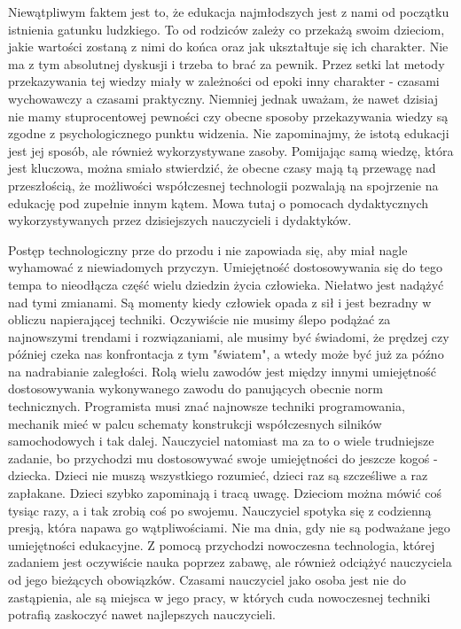 \documentclass{article}
\begin{document}
\par
Niewątpliwym faktem jest to, że edukacja najmłodszych jest z nami od początku istnienia gatunku ludzkiego. To od rodziców zależy co przekażą swoim dzieciom, jakie wartości zostaną z nimi do końca oraz jak ukształtuje się ich charakter. Nie ma z tym absolutnej dyskusji i trzeba to brać za pewnik. Przez setki lat metody przekazywania tej wiedzy miały w zależności od epoki inny charakter - czasami wychowawczy a czasami praktyczny. Niemniej jednak uważam, że nawet dzisiaj nie mamy stuprocentowej pewności czy obecne sposoby przekazywania wiedzy są zgodne z psychologicznego punktu widzenia. Nie zapominajmy, że istotą edukacji jest jej sposób, ale również wykorzystywane zasoby. Pomijając samą wiedzę, która jest kluczowa, można smiało stwierdzić, że obecne czasy mają tą przewagę nad przeszłością, że możliwości współczesnej technologii pozwalają na spojrzenie na edukację pod zupełnie innym kątem. Mowa tutaj o pomocach dydaktycznych wykorzystywanych przez dzisiejszych nauczycieli i dydaktyków.
\par
Postęp technologiczny prze do przodu i nie zapowiada się, aby miał nagle wyhamować z niewiadomych przyczyn. Umiejętność dostosowywania się do tego tempa to nieodłącza część wielu dziedzin życia człowieka. Niełatwo jest nadążyć nad tymi zmianami. Są momenty kiedy człowiek opada z sił i jest bezradny w obliczu napierającej techniki. Oczywiście nie musimy ślepo podążać za najnowszymi trendami i rozwiązaniami, ale musimy być świadomi, że prędzej czy później czeka nas konfrontacja z tym "światem", a wtedy może być już za późno na nadrabianie zaległości. Rolą wielu zawodów jest między innymi umiejętność dostosowywania wykonywanego zawodu do panujących obecnie norm technicznych. Programista musi znać najnowsze techniki programowania, mechanik mieć w palcu schematy konstrukcji współczesnych silników samochodowych i tak dalej. Nauczyciel natomiast ma za to o wiele trudniejsze zadanie, bo przychodzi mu dostosowywać swoje umiejętności do jeszcze kogoś - dziecka. Dzieci nie muszą wszystkiego rozumieć, dzieci raz są szcześliwe a raz zapłakane. Dzieci szybko zapominają i tracą uwagę. Dzieciom można mówić coś tysiąc razy, a i tak zrobią coś po swojemu. Nauczyciel spotyka się z codzienną presją, która napawa go wątpliwościami. Nie ma dnia, gdy nie są podważane jego umiejętności edukacyjne. Z pomocą przychodzi nowoczesna technologia, której zadaniem jest oczywiście nauka poprzez zabawę, ale również odciążyć nauczyciela od jego bieżących obowiązków. Czasami nauczyciel jako osoba jest nie do zastąpienia, ale są miejsca w jego pracy, w których cuda nowoczesnej techniki potrafią zaskoczyć nawet najlepszych nauczycieli.
\end{document}

